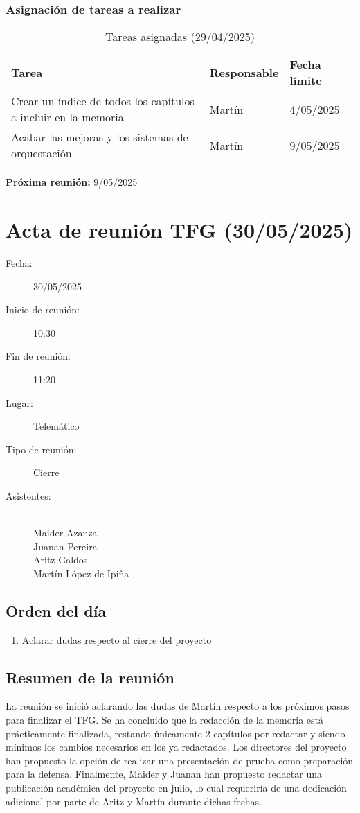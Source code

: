\subsubsection{Asignación de tareas a realizar}
\begin{table}[h]
    \centering
    \begin{tabular}{|p{8cm}|p{3cm}|p{3cm}|}
        \hline
        \textbf{Tarea} & \textbf{Responsable} & \textbf{Fecha límite} \\
        \hline
        Crear un índice de todos los capítulos a incluir en la memoria & Martín & 4/05/2025 \\
        \hline
        Acabar las mejoras y los sistemas de orquestación & Martín & 9/05/2025 \\
        \hline
    \end{tabular}
    \caption{Tareas asignadas (29/04/2025)}
\end{table}

\textbf{Próxima reunión:} 9/05/2025
\clearpage
\section{Acta de reunión TFG (30/05/2025)}
\begin{description}
    \item[Fecha:] 30/05/2025
    \item[Inicio de reunión:] 10:30
    \item[Fin de reunión:] 11:20
    \item[Lugar:] Telemático
    \item[Tipo de reunión:] Cierre
    \item[Asistentes:] ~\\
    Maider Azanza\\
    Juanan Pereira\\
    Aritz Galdos\\
    Martín López de Ipiña
\end{description}
\subsection{Orden del día}
\begin{enumerate}
    \item Aclarar dudas respecto al cierre del proyecto
\end{enumerate}
\subsection{Resumen de la reunión}
La reunión se inició aclarando las dudas de Martín respecto a los próximos pasos para finalizar el TFG. Se ha concluido que la redacción de la memoria está prácticamente finalizada, restando únicamente 2 capítulos por redactar y siendo mínimos los cambios necesarios en los ya redactados. Los directores del proyecto han propuesto la opción de realizar una presentación de prueba como preparación para la defensa.
Finalmente, Maider y Juanan han propuesto redactar una publicación académica del proyecto en julio, lo cual requeriría de una dedicación adicional por parte de Aritz y Martín durante dichas fechas.
